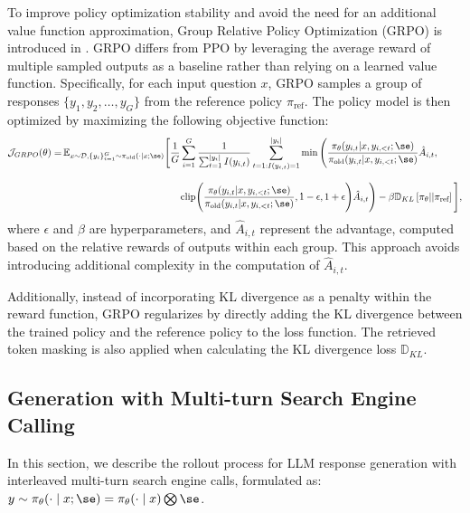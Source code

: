 To improve policy optimization stability and avoid the need for an additional value function approximation, Group Relative Policy Optimization (GRPO) is introduced in \cite{shao2024deepseekmath}. GRPO differs from PPO by leveraging the average reward of multiple sampled outputs as a baseline rather than relying on a learned value function. Specifically, for each input question \( x \), GRPO samples a group of responses \( \{ y_1, y_2, \dots, y_G \} \) from the reference policy \( \pi_{\text{ref}} \). The policy model is then optimized by maximizing the following objective function:
{\scriptsize
\begin{align}\label{eq:grpo}
\mathcal{J}_{GRPO}(\theta) = \, & 
\mathbb{E}_{x \sim \mathcal{D}, \{ y_i \}_{i=1}^{G} \sim \pi_{\text{old}}( \cdot| x; \se)}
\Bigg[
\frac{1}{G} \sum_{i=1}^{G} \frac{1}{\sum_{t=1}^{|y_i|}  I(y_{i,t})} \sum_{t=1: I(y_{i,t})=1}^{|y_i|} 
\min \Bigg( 
\frac{\pi_{\theta}(y_{i,t} | x, y_{i,<t}; \se)}{\pi_{\text{old}}(y_{i,t} | x, y_{i,<t}; \se)} \hat{A}_{i,t}, 
\nonumber \\[8pt] 
& \hspace{120pt} \text{clip} \Bigg( \frac{\pi_{\theta}(y_{i,t} | x, y_{i,<t}; \se)}{\pi_{\text{old}}(y_{i,t} | x, y_{i,<t}; \se)}, 1 - \epsilon, 1 + \epsilon \Bigg) \hat{A}_{i,t} 
\Bigg)
- \beta \mathbb{D}_{KL} \left[ \pi_{\theta} || \pi_{\text{ref}} \right]
\Bigg],
\end{align}
}
where \( \epsilon \) and \( \beta \) are hyperparameters, and \( \hat{A}_{i,t} \) represent the advantage, computed based on the relative rewards of outputs within each group. 
This approach avoids introducing additional complexity in the computation of \( \hat{A}_{i,t} \).

Additionally, instead of incorporating KL divergence as a penalty within the reward function, GRPO regularizes by directly adding the KL divergence between the trained policy and the reference policy to the loss function. 
The retrieved token masking is also applied when calculating the KL divergence loss $\mathbb{D}_{KL}$.

\subsection{Generation with Multi-turn Search Engine Calling}\label{sec:rollout}

In this section, we describe the rollout process for LLM response generation with interleaved multi-turn search engine calls, formulated as: $y\sim \pi_{\theta}(\cdot \mid x; \se) = \pi_{\theta}(\cdot \mid x) \bigotimes \se$.

